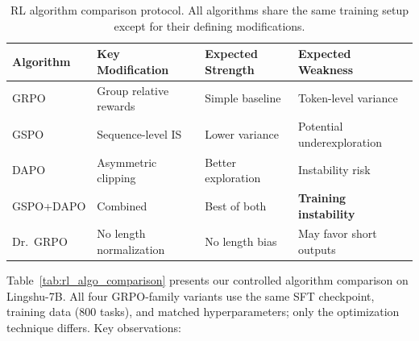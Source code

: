 \documentclass{article}
\begin{document}
\begin{table}[t]
\centering
\caption{RL algorithm comparison protocol. All algorithms share the same training setup except for their defining modifications.}
\label{tab:rl_comparison}
\begin{tabular}{llll}
\toprule
\textbf{Algorithm} & \textbf{Key Modification} & \textbf{Expected Strength} & \textbf{Expected Weakness} \\
\midrule
GRPO & Group relative rewards & Simple baseline & Token-level variance \\
GSPO & Sequence-level IS & Lower variance & Potential underexploration \\
DAPO & Asymmetric clipping & Better exploration & Instability risk \\
GSPO+DAPO & Combined & Best of both & \textbf{Training instability} \\
Dr.~GRPO & No length normalization & No length bias & May favor short outputs \\
\bottomrule
\end{tabular}
\end{table}

Table~\ref{tab:rl_algo_comparison} presents our controlled algorithm comparison on Lingshu-7B. All four GRPO-family variants use the same SFT checkpoint, training data (800 tasks), and matched hyperparameters; only the optimization technique differs. Key observations:
\end{document}
